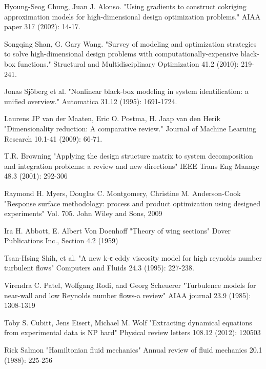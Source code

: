 \documentclass[a4paper,onecolumn]{article}
\theoremstyle{remark}
\begin{document}
\begin{thebibliography}{9}
Hyoung-Seog Chung, Juan J. Alonso. 
"Using gradients to construct cokriging approximation models for high-dimensional design optimization problems." 
AIAA paper 317 (2002): 14-17.

Songqing Shan, G. Gary Wang. 
"Survey of modeling and optimization strategies to solve high-dimensional design problems with computationally-expensive black-box functions." 
Structural and Multidisciplinary Optimization 41.2 (2010): 219-241.

Jonas Sjöberg et al.
"Nonlinear black-box modeling in system identification: a unified overview." 
Automatica 31.12 (1995): 1691-1724.

Laurens JP van der Maaten, Eric O. Postma, H. Jaap van den Herik
"Dimensionality reduction: A comparative review." 
Journal of Machine Learning Research 10.1-41 (2009): 66-71.

T.R. Browning
"Applying the design structure matrix to system decomposition and integration problems: a review
 and new directions"
IEEE Trans Eng Manage 48.3 (2001): 292-306

Raymond H. Myers, Douglas C. Montgomery, Christine M. Anderson-Cook
"Response surface methodology: process and product optimization using designed experiments"
Vol. 705. John Wiley and Sons, 2009

Ira H. Abbott, E. Albert Von Doenhoff
"Theory of wing sections"
Dover Publications Inc., Section 4.2 (1959)

Tsan-Hsing Shih, et al. 
"A new k-ϵ eddy viscosity model for high reynolds number turbulent flows" 
Computers and Fluids 24.3 (1995): 227-238.

Virendra C. Patel, Wolfgang Rodi, and Georg Scheuerer
"Turbulence models for near-wall and low Reynolds number flows-a review"
AIAA journal 23.9 (1985): 1308-1319

Toby S. Cubitt, Jens Eisert, Michael M. Wolf
"Extracting dynamical equations from experimental data is NP hard"
Physical review letters 108.12 (2012): 120503

Rick Salmon 
"Hamiltonian fluid mechanics"
Annual review of fluid mechanics 20.1 (1988): 225-256


\end{thebibliography}
\end{document}

